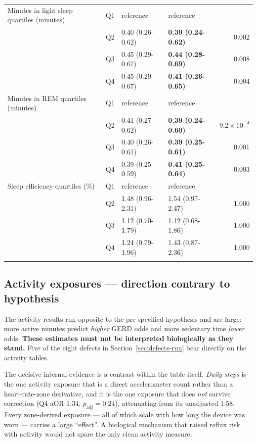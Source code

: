 \documentclass[11pt]{article}
\begin{document}
\begin{longtable}{@{}p{5.2cm}c p{3.0cm} p{3.0cm} r@{}}
\addlinespace
Minutes in light sleep quartiles (minutes) & Q1 & reference & reference & \\
 & Q2 & 0.40 (0.26-0.62) & \textbf{0.39 (0.24-0.62)} & 0.002 \\
 & Q3 & 0.45 (0.29-0.67) & \textbf{0.44 (0.28-0.69)} & 0.008 \\
 & Q4 & 0.45 (0.29-0.67) & \textbf{0.41 (0.26-0.65)} & 0.004 \\
\addlinespace
Minutes in REM quartiles (minutes) & Q1 & reference & reference & \\
 & Q2 & 0.41 (0.27-0.62) & \textbf{0.39 (0.24-0.60)} & $9.2\times10^{-4}$ \\
 & Q3 & 0.40 (0.26-0.61) & \textbf{0.39 (0.25-0.61)} & 0.001 \\
 & Q4 & 0.39 (0.25-0.59) & \textbf{0.41 (0.25-0.64)} & 0.003 \\
\addlinespace
Sleep efficiency quartiles (\%) & Q1 & reference & reference & \\
 & Q2 & 1.48 (0.96-2.31) & 1.54 (0.97-2.47) & 1.000 \\
 & Q3 & 1.12 (0.70-1.79) & 1.12 (0.68-1.86) & 1.000 \\
 & Q4 & 1.24 (0.79-1.96) & 1.43 (0.87-2.36) & 1.000 \\
\addlinespace
\bottomrule \end{longtable}

\subsection{Activity exposures --- direction contrary to hypothesis}
\label{sec:activity-anomaly}
The activity results run opposite to the pre-specified hypothesis and are large: more active
minutes predict \emph{higher} GERD odds and more sedentary time \emph{lower} odds.
\textbf{These estimates must not be interpreted biologically as they stand.} Five of the eight
defects in Section~\ref{sec:defects-run} bear directly on the activity tables.

The decisive internal evidence is a contrast within the table itself. \emph{Daily steps} is the one
activity exposure that is a direct accelerometer count rather than a heart-rate-zone derivative,
and it is the one exposure that does \emph{not} survive correction (Q4 aOR $1.34$,
$p_{\text{adj}}=0.24$), attenuating from its unadjusted $1.58$. Every zone-derived exposure --- all
of which scale with how long the device was worn --- carries a large ``effect''. A biological
mechanism that raised reflux risk with activity would not spare the only clean activity measure.
\end{document}
